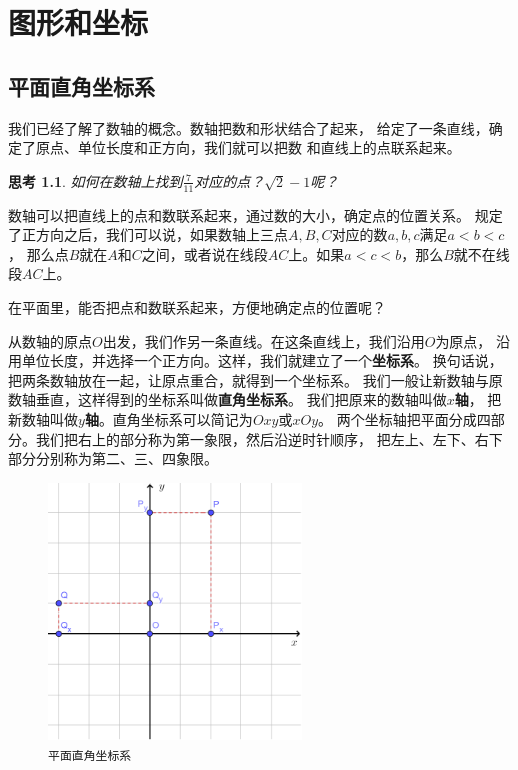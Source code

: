\documentclass[12pt,UTF8]{ctexbook}
\newtheorem{sk}{思考}[section]
\begin{document}
\chapter{图形和坐标}
\section{平面直角坐标系}
我们已经了解了数轴的概念。数轴把数和形状结合了起来，
给定了一条直线，确定了原点、单位长度和正方向，我们就可以把数
和直线上的点联系起来。

\begin{sk}\label{sk:4-0-0}
    如何在数轴上找到$\frac{7}{11}$对应的点？$\sqrt{2} - 1$呢？
\end{sk}

数轴可以把直线上的点和数联系起来，通过数的大小，确定点的位置关系。
规定了正方向之后，我们可以说，如果数轴上三点$A,B,C$对应的数$a,b,c$满足$a < b < c$，
那么点$B$就在$A$和$C$之间，或者说在线段$AC$上。如果$a < c < b$，那么$B$就不在线段$AC$上。

在平面里，能否把点和数联系起来，方便地确定点的位置呢？

从数轴的原点$O$出发，我们作另一条直线。在这条直线上，我们沿用$O$为原点，
沿用单位长度，并选择一个正方向。这样，我们就建立了一个\textbf{坐标系}。
换句话说，把两条数轴放在一起，让原点重合，就得到一个坐标系。
我们一般让新数轴与原数轴垂直，这样得到的坐标系叫做\textbf{直角坐标系}。
我们把原来的数轴叫做$x$\textbf{轴}，
把新数轴叫做$y$\textbf{轴}。直角坐标系可以简记为$Oxy$或$xOy$。
两个坐标轴把平面分成四部分。我们把右上的部分称为第一象限，然后沿逆时针顺序，
把左上、左下、右下部分分别称为第二、三、四象限。

\begin{figure} %
    \vspace{-30pt}
    \centering
    \includegraphics[width=0.6\textwidth]{坐标系2.png}
    \caption*{\texttt{平面直角坐标系}}
\end{figure}
\end{document}

